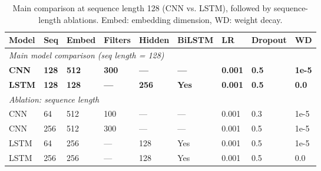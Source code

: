 \begin{table}[h]
\centering
\small
\begin{tabular}{lllllllll}
\toprule
\textbf{Model} & \textbf{Seq} & \textbf{Embed} & \textbf{Filters} & \textbf{Hidden} & \textbf{BiLSTM} & \textbf{LR} & \textbf{Dropout} & \textbf{WD} \\
\midrule
\multicolumn{9}{l}{\textit{Main model comparison (seq length = 128)}} \\
\textbf{CNN} & \textbf{128} & \textbf{512} & \textbf{300} & \textbf{---} & \textbf{---} & \textbf{0.001} & \textbf{0.5} & \textbf{1e-5} \\
\textbf{LSTM} & \textbf{128} & \textbf{128} & \textbf{---} & \textbf{256} & \textbf{Yes} & \textbf{0.001} & \textbf{0.5} & \textbf{0.0} \\
\midrule
\multicolumn{9}{l}{\textit{Ablation: sequence length}} \\
CNN & 64 & 512 & 100 & --- & --- & 0.001 & 0.3 & 1e-5 \\
CNN & 256 & 512 & 300 & --- & --- & 0.001 & 0.5 & 1e-5 \\
LSTM & 64 & 256 & --- & 128 & Yes & 0.001 & 0.5 & 1e-5 \\
LSTM & 256 & 256 & --- & 128 & Yes & 0.001 & 0.5 & 0.0 \\
\bottomrule
\end{tabular}
\caption{Main comparison at sequence length 128 (CNN vs. LSTM), followed by sequence-length ablations. Embed: embedding dimension, WD: weight decay.}
\label{tab:main_vs_ablation}
\end{table}
